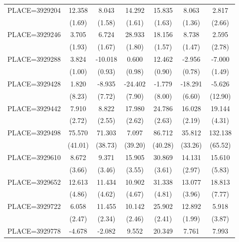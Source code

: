 {\begin{tabular}{l*{6}{c}}
PLACE=3929204       &      12.358&       8.043&      14.292&      15.835&       8.063&       2.817\\
                    &      (1.69)&      (1.58)&      (1.61)&      (1.63)&      (1.36)&      (2.66)\\
PLACE=3929246       &       3.705&       6.724&      28.933&      18.156&       8.738&       2.595\\
                    &      (1.93)&      (1.67)&      (1.80)&      (1.57)&      (1.47)&      (2.78)\\
PLACE=3929288       &       3.824&     -10.018&       0.600&      12.462&      -2.956&      -7.000\\
                    &      (1.00)&      (0.93)&      (0.98)&      (0.90)&      (0.78)&      (1.49)\\
PLACE=3929428       &       1.820&      -8.935&     -24.402&      -1.779&     -18.291&      -5.626\\
                    &      (8.23)&      (7.72)&      (7.90)&      (8.00)&      (6.60)&     (12.90)\\
PLACE=3929442       &       7.910&       8.822&      17.980&      24.786&      16.028&      19.144\\
                    &      (2.72)&      (2.55)&      (2.62)&      (2.63)&      (2.19)&      (4.31)\\
PLACE=3929498       &      75.570&      71.303&       7.097&      86.712&      35.812&     132.138\\
                    &     (41.01)&     (38.73)&     (39.20)&     (40.28)&     (33.26)&     (65.52)\\
PLACE=3929610       &       8.672&       9.371&      15.905&      30.869&      14.131&      15.610\\
                    &      (3.66)&      (3.46)&      (3.55)&      (3.61)&      (2.97)&      (5.83)\\
PLACE=3929652       &      12.613&      11.434&      10.902&      31.338&      13.077&      18.813\\
                    &      (4.86)&      (4.62)&      (4.67)&      (4.81)&      (3.96)&      (7.77)\\
PLACE=3929722       &       6.058&      11.455&      10.142&      25.902&      12.892&       5.918\\
                    &      (2.47)&      (2.34)&      (2.46)&      (2.41)&      (1.99)&      (3.87)\\
PLACE=3929778       &      -4.678&      -2.082&       9.552&      20.349&       7.761&       7.993\\

\end{tabular}}

